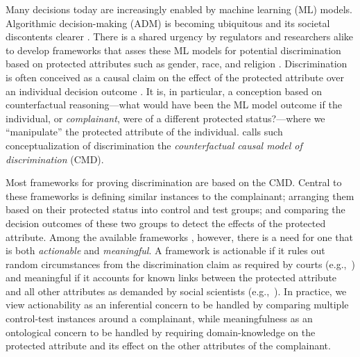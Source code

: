 %
Many decisions today are increasingly enabled by machine learning (ML) models.
Algorithmic decision-making (ADM) is becoming ubiquitous and its societal discontents clearer \parencite{Angwin2016MachineBias, DastinAmazonSexist, Heikkila2022_DutchScnadal}. 
There is a shared urgency by regulators and researchers alike to develop frameworks that asses these ML models for potential discrimination based on protected attributes such as gender, race, and religion \parencite{Kleinberg2019DiscAgeOfAlgo, DBLP:conf/aaai/Ruggieri0PST23, DBLP:journals/ethicsit/AlvarezCEFFFGMPLRSSZR24}. 
Discrimination is often conceived as a causal claim on the effect of the protected attribute over an individual decision outcome \parencite{Heckman1998_DetectingDiscrimination}. It is, in particular, a conception based on counterfactual reasoning---what would have been the ML model outcome if the individual, or \textit{complainant}, were of a different protected status?---where we ``manipulate'' the protected attribute of the individual. \textcite{Kohler2018CausalEddie} calls such conceptualization of discrimination the \textit{counterfactual causal model of discrimination} (CMD). 

Most frameworks for proving discrimination are based on the CMD. 
Central to these frameworks is defining similar instances to the complainant; arranging them based on their protected status into control and test groups; and comparing the decision outcomes of these two groups to detect the effects of the protected attribute. 
Among the available frameworks \parencite{Romei2014MultiSurveyDiscrimination,DBLP:journals/jlap/MakhloufZP24, DBLP:journals/fdata/CareyW22}, however, there is a need for one that is both \textit{actionable} and \textit{meaningful}. 
A framework is actionable if it rules out random circumstances from the discrimination claim as required by courts (e.g.,~\textcite{Foster2004, EU2018_NonDiscriminationLaw, Nachbar2020algorithmic}) and meaningful if it accounts for known links between the protected attribute and all other attributes 
as demanded by social scientists (e.g.,~\textcite{Bonilla1997_RethinkingRace, Sen2016_RaceABundle, Kasirzadeh2021UseMisuse}).
%
In practice, we view actionability as an inferential concern to be handled by comparing multiple control-test instances around a complainant, while meaningfulness as an ontological concern to be handled by requiring domain-knowledge on the protected attribute and its effect on the other attributes of the complainant.

